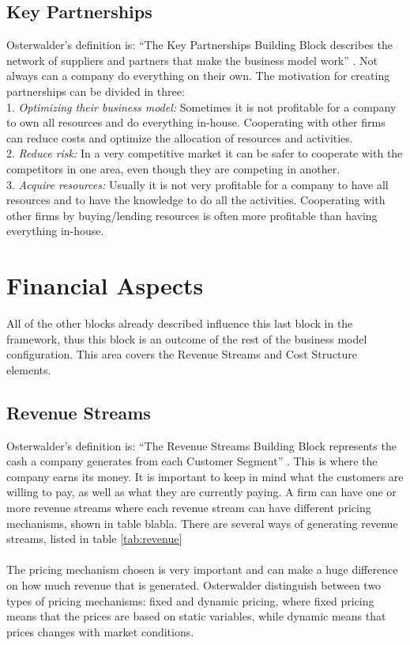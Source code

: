 \subsection{Key Partnerships}
Osterwalder’s definition is: “The Key Partnerships Building Block describes the network of suppliers and partners that make the business model work” \cite{osterwalder}. Not always can a company do everything on their own. The motivation for creating partnerships can be divided in three: 
\\
1. \emph{Optimizing their business model:} Sometimes it is not profitable for a company to own all resources and do everything in-house. Cooperating with other firms can reduce costs and optimize the allocation of resources and activities. 
\\
2. \emph{Reduce risk:} In a very competitive market it can be safer to cooperate with the competitors in one area, even though they are competing in another.
\\
3. \emph{Acquire resources:} Usually it is not very profitable for a company to have all resources and to have the knowledge to do all the activities. Cooperating with other firms by buying/lending resources is often more profitable than having everything in-house. \cite{osterwalder}

\section{Financial Aspects}
All of the other blocks already described influence this last block in the framework, thus this block is an outcome of the rest of the business model configuration. This area covers the Revenue Streams and Cost Structure elements. \cite{osterwalderthesis}

\subsection{Revenue Streams}
Osterwalder’s definition is: “The Revenue Streams Building Block represents the cash a company generates from each Customer Segment” \cite{osterwalder}. This is where the company earns its money. It is important to keep in mind what the customers are willing to pay, as well as what they are currently paying. A firm can have one or more revenue streams where each revenue stream can have different pricing mechanisms, shown in table blabla. There are several ways of generating revenue streams, listed in table \ref{tab:revenue}  \\ \\ 
The pricing mechanism chosen is very important and can make a huge difference on how much revenue that is generated. Osterwalder distinguish between two types of pricing mechanisms: fixed and dynamic pricing, where fixed pricing means that the prices are based on static variables, while dynamic means that prices changes with market conditions. \cite{osterwalder}

